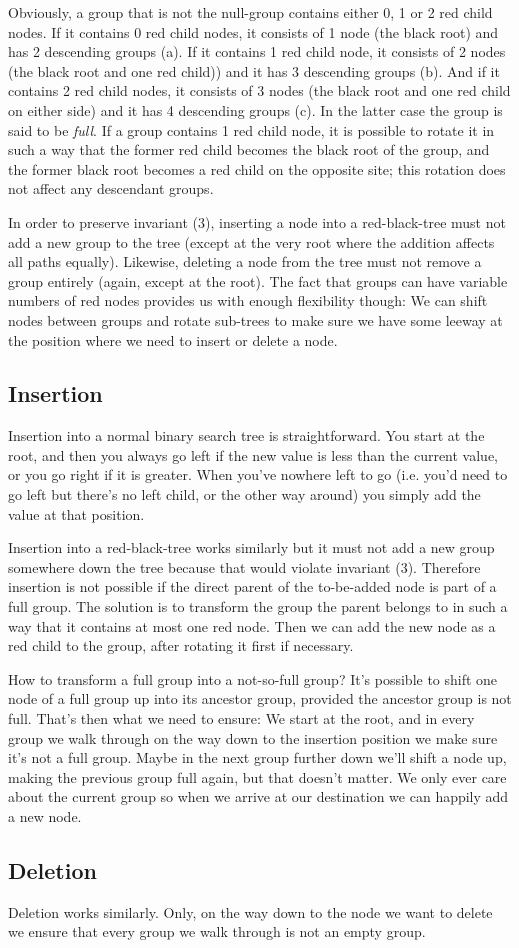 \documentclass{article}
\begin{document}
Obviously, a group that is not the null-group contains either 0, 1 or 2 red child nodes.
If it contains 0 red child nodes, it consists of 1 node (the black root) and has 2
descending groups (a). If it contains 1 red child node, it consists of 2 nodes (the
black root and one red child)) and it has 3 descending groups (b). And if it contains 2
red child nodes, it consists of 3 nodes (the black root and one red child on either
side) and it has 4 descending groups (c). In the latter case the group is said to be
\emph{full}. If a group contains 1 red child node, it is possible to rotate it in such a
way that the former red child becomes the black root of the group, and the former black
root becomes a red child on the opposite site; this rotation does not affect any
descendant groups.

In order to preserve invariant (3), inserting a node into a red-black-tree must not add
a new group to the tree (except at the very root where the addition affects all paths
equally). Likewise, deleting a node from the tree must not remove a group entirely
(again, except at the root). The fact that groups can have variable numbers of red nodes
provides us with enough flexibility though: We can shift nodes between groups and rotate
sub-trees to make sure we have some leeway at the position where we need to insert or
delete a node.

\subsection{Insertion}
Insertion into a normal binary search tree is straightforward. You start at the root,
and then you always go left if the new value is less than the current value, or you go
right if it is greater. When you've nowhere left to go (i.e. you'd need to go left but
there's no left child, or the other way around) you simply add the value at that
position.

Insertion into a red-black-tree works similarly but it must not add a new group
somewhere down the tree because that would violate invariant (3). Therefore insertion is
not possible if the direct parent of the to-be-added node is part of a full group. The
solution is to transform the group the parent belongs to in such a way that it contains
at most one red node. Then we can add the new node as a red child to the group, after
rotating it first if necessary.

How to transform a full group into a not-so-full group? It's possible to shift one
node of a full group up into its ancestor group, provided the ancestor group is not
full. That's then what we need to ensure: We start at the root, and in every group we
walk through on the way down to the insertion position we make sure it's not a full
group. Maybe in the next group further down we'll shift a node up, making the previous
group full again, but that doesn't matter. We only ever care about the current group so
when we arrive at our destination we can happily add a new node.

\subsection{Deletion}
Deletion works similarly. Only, on the way down to the node we want to delete we ensure
that every group we walk through is not an empty group.
\end{document}

